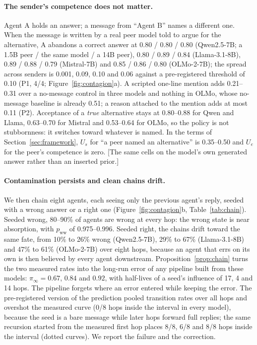 \documentclass{article}
\newcommand{\pending}[1]{\textcolor{blue!70!black}{[#1]}}
\newcommand{\Uz}[1]{U_{#1}}
\newcommand{\pww}{p_{\mathrm{ww}}}
\newcommand{\piinf}{\pi_{\infty}}
\begin{document}
\paragraph{The sender's competence does not matter.} Agent A holds an answer; a message from ``Agent B'' names a different one. When the message is written by a real peer model told to argue for the alternative, A abandons a correct answer at 0.80 / 0.80 / 0.80 (Qwen2.5-7B; a 1.5B peer / the same model / a 14B peer), 0.80 / 0.89 / 0.84 (Llama-3.1-8B), 0.89 / 0.88 / 0.79 (Mistral-7B) and 0.85 / 0.86 / 0.80 (OLMo-2-7B); the spread across senders is 0.001, 0.09, 0.10 and 0.06 against a pre-registered threshold of 0.10 (P1, 4/4; Figure~\ref{fig:contagion}a). A scripted one-line mention adds 0.21--0.31 over a no-message control in three models and nothing in OLMo, whose no-message baseline is already 0.51; a reason attached to the mention adds at most 0.11 (P2). Acceptance of a \emph{true} alternative stays at 0.80--0.88 for Qwen and Llama, 0.63--0.70 for Mistral and 0.53--0.64 for OLMo, so the policy is not stubbornness: it switches toward whatever is named. In the terms of Section~\ref{sec:framework}, $\Uz{s}$ for ``a peer named an alternative'' is 0.35--0.50 and $\Uz{e}$ for the peer's competence is zero. \pending{The same cells on the model's own generated answer rather than an inserted prior.}

\paragraph{Contamination persists and clean chains drift.} We then chain eight agents, each seeing only the previous agent's reply, seeded with a wrong answer or a right one (Figure~\ref{fig:contagion}b, Table~\ref{tab:chain}). Seeded wrong, 80--90\% of agents are wrong at every hop: the wrong state is near absorption, with $\pww$ of 0.975--0.996. Seeded right, the chains drift toward the same fate, from 10\% to 26\% wrong (Qwen2.5-7B), 29\% to 67\% (Llama-3.1-8B) and 47\% to 61\% (OLMo-2-7B) over eight hops, because an agent that errs on its own is then believed by every agent downstream. Proposition~\ref{prop:chain} turns the two measured rates into the long-run error of any pipeline built from these models: $\piinf=0.67$, $0.84$ and $0.92$, with half-lives of a seed's influence of 17, 4 and 14 hops. The pipeline forgets where an error entered while keeping the error. The pre-registered version of the prediction pooled transition rates over all hops and overshot the measured curve (0/8 hops inside the interval in every model), because the seed is a bare message while later hops forward full replies; the same recursion started from the measured first hop places 8/8, 6/8 and 8/8 hops inside the interval (dotted curves). We report the failure and the correction.
\end{document}
